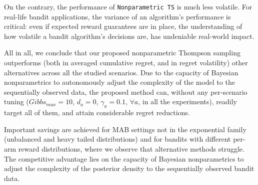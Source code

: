 On the contrary, the performance of \texttt{Nonparametric TS} is much less volatile.
For real-life bandit applications, the variance of an algorithm's performance is critical: even if expected reward guarantees are in place, the understanding of how volatile a bandit algorithm's decisions are, has undeniable real-world impact.

All in all, we conclude that our proposed nonparametric Thompson sampling outperforms (both in averaged cumulative regret, and in regret volatility) other alternatives across all the studied scenarios. Due to the capacity of Bayesian nonparametrics to autonomously adjust the complexity of the model to the sequentially observed data, the proposed method can, without any per-scenario tuning ($Gibbs_{max}=10$, $d_a=0$, $\gamma_a=0.1$, $\forall a$, in all the experiments), readily target all of them, and attain considerable regret reductions.

Important savings are achieved for MAB settings not in the exponential family (\ie unbalanced and heavy tailed distributions) and for bandits with different per-arm reward distributions, where we observe that alternative methods struggle.
The competitive advantage lies on the capacity of Bayesian nonparametrics to adjust the complexity of the posterior density to the sequentially observed bandit data. 

